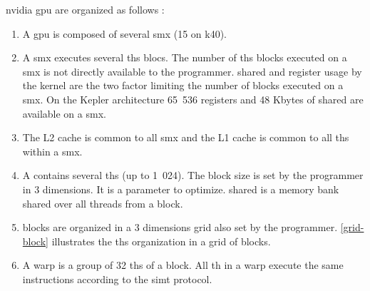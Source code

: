 \gls{nvidia} \gls{gpu} are organized as follows \cite{doccuda} :
\begin{enumerate}

\item A \gls{gpu} is composed of several \gls{smx} (15 on \gls{k40}).

\item A \gls{smx} executes several \glspl{th} \glspl{bloc}.
The number of \glspl{th} \glspl{block} executed on a \gls{smx} is not directly available to the programmer.
\Gls{shared} and register usage by the kernel are the two factor limiting the number of \glspl{block} executed on a \gls{smx}.
On the Kepler architecture 65~536 registers and 48 Kbytes of \gls{shared} are available on a \gls{smx}.

\item The L2 cache is common to all \gls{smx} and the L1 cache is common to all \glspl{th} within a \gls{smx}.

\item A  contains several \glspl{th} (up to 1~024).
The \gls{block} size is set by the programmer in 3 dimensions. It is a parameter to optimize.
\Gls{shared} is a memory bank shared over all threads from a \gls{block}.

\item \Glspl{block} are organized in a 3 dimensions grid also set by the programmer. 
\autoref{grid-block} illustrates the \glspl{th} organization in a grid of \glspl{block}.

\item A \gls{warp} is a group of 32 \glspl{th} of a block.
All \gls{th} in a \gls{warp} execute the same instructions according to the \gls{simt} protocol.

\end{enumerate}
\bigskip




